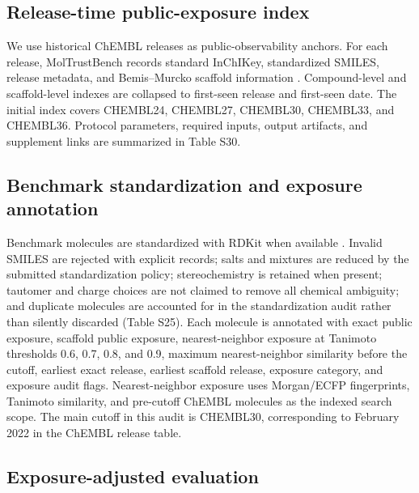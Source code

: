 \documentclass[unnumsec,webpdf,contemporary,large,numbered]{oup-authoring-template}
\begin{document}
\subsection{Release-time public-exposure index}

We use historical ChEMBL releases as public-observability anchors. For each release, MolTrustBench records standard InChIKey, standardized SMILES, release metadata, and Bemis--Murcko scaffold information \cite{chemblDownloads2025,bemis1996}. Compound-level and scaffold-level indexes are collapsed to first-seen release and first-seen date. The initial index covers CHEMBL24, CHEMBL27, CHEMBL30, CHEMBL33, and CHEMBL36. Protocol parameters, required inputs, output artifacts, and supplement links are summarized in Table S30.

\subsection{Benchmark standardization and exposure annotation}

Benchmark molecules are standardized with RDKit when available \cite{rdkit}. Invalid SMILES are rejected with explicit records; salts and mixtures are reduced by the submitted standardization policy; stereochemistry is retained when present; tautomer and charge choices are not claimed to remove all chemical ambiguity; and duplicate molecules are accounted for in the standardization audit rather than silently discarded (Table S25). Each molecule is annotated with exact public exposure, scaffold public exposure, nearest-neighbor exposure at Tanimoto thresholds 0.6, 0.7, 0.8, and 0.9, maximum nearest-neighbor similarity before the cutoff, earliest exact release, earliest scaffold release, exposure category, and exposure audit flags. Nearest-neighbor exposure uses Morgan/ECFP fingerprints, Tanimoto similarity, and pre-cutoff ChEMBL molecules as the indexed search scope. The main cutoff in this audit is CHEMBL30, corresponding to February 2022 in the ChEMBL release table.

\subsection{Exposure-adjusted evaluation}
\end{document}
